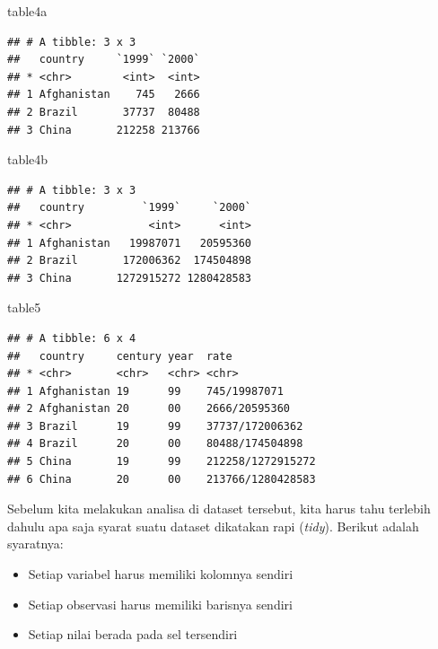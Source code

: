 \documentclass[]{book}
\newenvironment{Shaded}{\begin{snugshade}}{\end{snugshade}}
\newcommand{\NormalTok}[1]{#1}
\providecommand{\tightlist}{%
  \setlength{\itemsep}{0pt}\setlength{\parskip}{0pt}}
\begin{document}
\begin{Shaded}
\begin{Highlighting}[]
\NormalTok{table4a                 }
\end{Highlighting}
\end{Shaded}

\begin{verbatim}
## # A tibble: 3 x 3
##   country     `1999` `2000`
## * <chr>        <int>  <int>
## 1 Afghanistan    745   2666
## 2 Brazil       37737  80488
## 3 China       212258 213766
\end{verbatim}

\begin{Shaded}
\begin{Highlighting}[]
\NormalTok{table4b                 }
\end{Highlighting}
\end{Shaded}

\begin{verbatim}
## # A tibble: 3 x 3
##   country         `1999`     `2000`
## * <chr>            <int>      <int>
## 1 Afghanistan   19987071   20595360
## 2 Brazil       172006362  174504898
## 3 China       1272915272 1280428583
\end{verbatim}

\begin{Shaded}
\begin{Highlighting}[]
\NormalTok{table5   }
\end{Highlighting}
\end{Shaded}

\begin{verbatim}
## # A tibble: 6 x 4
##   country     century year  rate             
## * <chr>       <chr>   <chr> <chr>            
## 1 Afghanistan 19      99    745/19987071     
## 2 Afghanistan 20      00    2666/20595360    
## 3 Brazil      19      99    37737/172006362  
## 4 Brazil      20      00    80488/174504898  
## 5 China       19      99    212258/1272915272
## 6 China       20      00    213766/1280428583
\end{verbatim}

Sebelum kita melakukan analisa di dataset tersebut, kita harus tahu
terlebih dahulu apa saja syarat suatu dataset dikatakan rapi
(\emph{tidy}). Berikut adalah syaratnya:

\begin{itemize}
\tightlist
\item
  Setiap variabel harus memiliki kolomnya sendiri
\item
  Setiap observasi harus memiliki barisnya sendiri
\item
  Setiap nilai berada pada sel tersendiri
\end{itemize}
\end{document}
